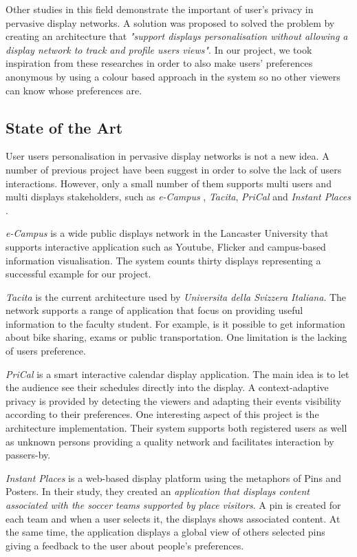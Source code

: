 \documentclass[]{usiinfbachelorproject}
\begin{document}
Other studies in this field demonstrate the important of user's privacy in pervasive display networks. A solution was proposed\cite{personalisation_and_privacy} to solved the problem by creating an architecture that \emph{"support displays personalisation without allowing a display network to track and profile users views"}.
In our project, we took inspiration from these researches in order to also make users' preferences anonymous by using a colour based approach in the system so no other viewers can know whose preferences are. 
 
\subsection{State of the Art}
User users personalisation in pervasive display networks is not a new idea. A number of previous project have been suggest in order to solve the lack of users interactions. However, only a small number of them supports multi users and multi displays stakeholders, such as \emph{e-Campus} \cite{e_campus}, \emph{Tacita}, \emph{PriCal} \cite{pri_cal} and \emph{Instant Places} \cite{pins_and_posters}.

\emph{e-Campus} is a wide public displays network in the Lancaster University that supports interactive application such as Youtube, Flicker and campus-based information visualisation. The system counts thirty displays representing a successful example for our project.

\emph{Tacita} is the current architecture used by \emph{Universita della Svizzera Italiana}. The network supports a range of application that focus on providing useful information to the faculty student. For example, is it possible to get information about bike sharing, exams or public transportation. One limitation is the lacking of users preference.

\emph{PriCal} is a smart interactive calendar display application. The main idea is to let the audience see their schedules directly into the display. A context-adaptive privacy is provided by detecting the viewers and adapting their events visibility according to their preferences. One interesting aspect of this project is the architecture implementation. Their system supports both registered users as well as unknown persons providing a quality network and facilitates interaction by passers-by. 

\emph{Instant Places} is a web-based display platform using the metaphors of Pins and Posters. In their study, they created an \emph{application that displays content associated with the soccer teams supported by place visitors}\cite{pins_and_posters}. A pin is created for each team and when a user selects it, the displays shows associated content. At the same time, the application displays a global view of others selected pins giving a feedback to the user about people's preferences.
\end{document}
